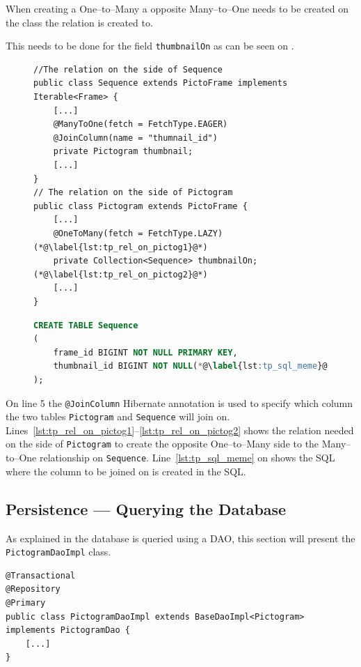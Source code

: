 When creating a One--to--Many a opposite Many--to--One needs to be created on the class the relation is created to.

This needs to be done for the field \texttt{thumbnailOn} as can be seen on .
\begin{figure}[!htb]
\begin{lstlisting}[caption={Fields with annotations which causes Hibernate to perfrm the ORM.}, label={lst:titlePictogram}]
//The relation on the side of Sequence
public class Sequence extends PictoFrame implements Iterable<Frame> {
    [...]
    @ManyToOne(fetch = FetchType.EAGER)
    @JoinColumn(name = "thumnail_id")
    private Pictogram thumbnail;
    [...]
}
// The relation on the side of Pictogram
public class Pictogram extends PictoFrame {
    [...]
    @OneToMany(fetch = FetchType.LAZY)(*@\label{lst:tp_rel_on_pictog1}@*)
    private Collection<Sequence> thumbnailOn;(*@\label{lst:tp_rel_on_pictog2}@*)
    [...]
}

\end{lstlisting}
\begin{lstlisting}[language=SQL,caption={The SQL save the keys for thumbnails for sequences.},label={lst:sqltitlepictogram}]
CREATE TABLE Sequence
(
    frame_id BIGINT NOT NULL PRIMARY KEY,
    thumbnail_id BIGINT NOT NULL(*@\label{lst:tp_sql_meme}@*)
);
\end{lstlisting}
\end{figure}

On line 5 the \texttt{@JoinColumn} Hibernate annotation is used to specify which column the two tables \texttt{Pictogram} and \texttt{Sequence} will join on.
Lines~\ref{lst:tp_rel_on_pictog1}--\ref{lst:tp_rel_on_pictog2} shows the relation needed on the side of \texttt{Pictogram} to create the opposite One--to--Many side to the Many--to--One relationship on \texttt{Sequence}.
Line~\ref{lst:tp_sql_meme} on  shows the SQL where the column to be joined on is created in the SQL.

\subsection{Persistence --- Querying the Database}
As explained in  the database is queried using a DAO, this section will present the \texttt{PictogramDaoImpl} class.

\begin{lstlisting}[float, floatplacement=h, caption={The class header of the \texttt{PictogramDao}, along with its annotations.},label={lst:pictogramDaoImpl}]
@Transactional
@Repository
@Primary
public class PictogramDaoImpl extends BaseDaoImpl<Pictogram> implements PictogramDao {
    [...]
}
\end{lstlisting}

